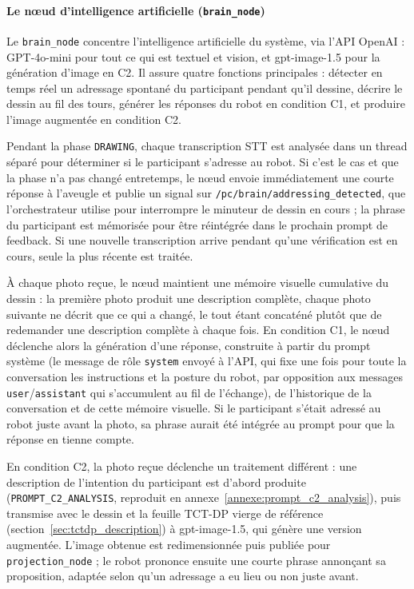 \documentclass[11pt]{article}
\begin{document}
\paragraph{Le nœud d'intelligence artificielle (\texttt{brain\_node})}
\label{sec:brain_node}

Le \texttt{brain\_node} concentre l'intelligence artificielle du système, via l'API OpenAI : GPT-4o-mini pour tout ce qui est textuel et vision, et gpt-image-1.5 pour la génération d'image en C2. Il assure quatre fonctions principales : détecter en temps réel un adressage spontané du participant pendant qu'il dessine, décrire le dessin au fil des tours, générer les réponses du robot en condition C1, et produire l'image augmentée en condition C2.

Pendant la phase \texttt{DRAWING}, chaque transcription STT est analysée dans un thread séparé pour déterminer si le participant s'adresse au robot. Si c'est le cas et que la phase n'a pas changé entretemps, le nœud envoie immédiatement une courte réponse à l'aveugle et publie un signal sur \texttt{/pc/brain/addressing\_detected}, que l'orchestrateur utilise pour interrompre le minuteur de dessin en cours ; la phrase du participant est mémorisée pour être réintégrée dans le prochain prompt de feedback. Si une nouvelle transcription arrive pendant qu'une vérification est en cours, seule la plus récente est traitée.

À chaque photo reçue, le nœud maintient une mémoire visuelle cumulative du dessin : la première photo produit une description complète, chaque photo suivante ne décrit que ce qui a changé, le tout étant concaténé plutôt que de redemander une description complète à chaque fois. En condition C1, le nœud déclenche alors la génération d'une réponse, construite à partir du prompt système (le message de rôle \texttt{system} envoyé à l'API, qui fixe une fois pour toute la conversation les instructions et la posture du robot, par opposition aux messages \texttt{user}/\texttt{assistant} qui s'accumulent au fil de l'échange), de l'historique de la conversation et de cette mémoire visuelle. Si le participant s'était adressé au robot juste avant la photo, sa phrase aurait été intégrée au prompt pour que la réponse en tienne compte.

En condition C2, la photo reçue déclenche un traitement différent : une description de l'intention du participant est d'abord produite (\texttt{PROMPT\_C2\_ANALYSIS}, reproduit en annexe~\ref{annexe:prompt_c2_analysis}), puis transmise avec le dessin et la feuille TCT-DP vierge de référence (section~\ref{sec:tctdp_description}) à gpt-image-1.5, qui génère une version augmentée. L'image obtenue est redimensionnée puis publiée pour \texttt{projection\_node} ; le robot prononce ensuite une courte phrase annonçant sa proposition, adaptée selon qu'un adressage a eu lieu ou non juste avant.
\end{document}
